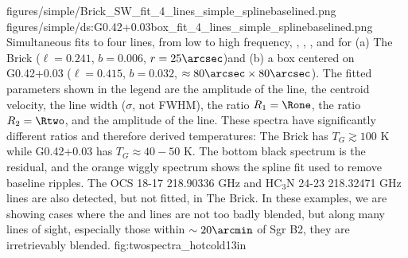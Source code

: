 \FigureTwo
{figures/simple/Brick_SW_fit_4_lines_simple_splinebaselined.png}
{figures/simple/ds:G0.42+0.03box_fit_4_lines_simple_splinebaselined.png}
{
Simultaneous fits to four lines, from low to high frequency, \para
\threeohthree, \methanol \fourtwotwo, \para \threetwotwo, and \para \threetwoone
for (a) The Brick ($\ell=0.241$, $b=0.006$, $r=25\arcsec$)and (b) a box
centered on G0.42+0.03 ($\ell=0.415$, $b=0.032$,
$\approx80\arcsec\times80\arcsec$).  The fitted parameters
shown in the legend are the amplitude of the \formaldehyde \threeohthree line,
the centroid velocity, the line width ($\sigma$, not FWHM), the ratio $R_1 =
\Rone$, the ratio $R_2 = \Rtwo$, and the amplitude of the \methanol \fourtwotwo
line.  These spectra have significantly different ratios and therefore derived
temperatures: The Brick has $T_G\gtrsim100$ K while G0.42+0.03 has
$T_G\approx40-50$ K.  The bottom black spectrum is the residual, and the orange
wiggly spectrum shows the spline fit used to remove baseline ripples.
The OCS 18-17 218.90336 GHz and HC$_3$N 24-23 218.32471 GHz lines are also
detected, but not fitted, in The Brick.
In these examples, we are showing cases where the \methanol \fourtwotwo and
\para \threetwotwo lines are not too badly blended, but along many lines of
sight, especially those within $\sim20\arcmin$ of Sgr B2, they are
irretrievably blended.
}
{fig:twospectra_hotcold}{1}{3in}


